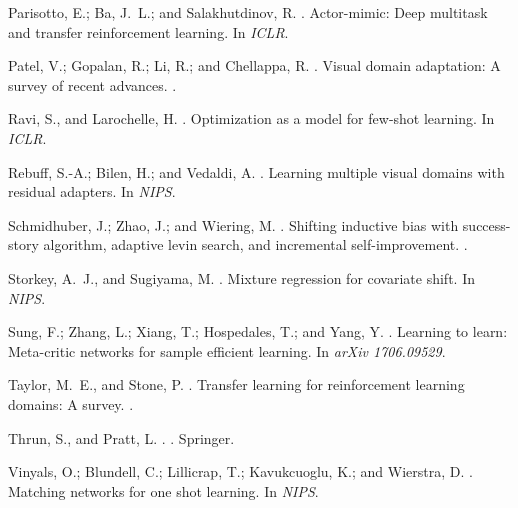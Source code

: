 \documentclass[letterpaper]{article} \usepackage{aaai18}  \usepackage{times}  \usepackage{helvet}  \usepackage{courier}  \usepackage{url}  \usepackage{graphicx}  \usepackage{amsmath}
\begin{document}
{{\begin{thebibliography}{}
Parisotto, E.; Ba, J.~L.; and Salakhutdinov, R.
.
\newblock Actor-mimic: Deep multitask and transfer reinforcement learning.
\newblock In {\em ICLR}.

Patel, V.; Gopalan, R.; Li, R.; and Chellappa, R.
.
\newblock Visual domain adaptation: A survey of recent advances.
.

Ravi, S., and Larochelle, H.
.
\newblock Optimization as a model for few-shot learning.
\newblock In {\em ICLR}.

Rebuff, S.-A.; Bilen, H.; and Vedaldi, A.
.
\newblock Learning multiple visual domains with residual adapters.
\newblock In {\em NIPS}.

Schmidhuber, J.; Zhao, J.; and Wiering, M.
.
\newblock Shifting inductive bias with success-story algorithm, adaptive levin
  search, and incremental self-improvement.
.

Storkey, A.~J., and Sugiyama, M.
.
\newblock Mixture regression for covariate shift.
\newblock In {\em NIPS}.

Sung, F.; Zhang, L.; Xiang, T.; Hospedales, T.; and Yang, Y.
.
\newblock Learning to learn: Meta-critic networks for sample efficient
  learning.
\newblock In {\em arXiv 1706.09529}.

Taylor, M.~E., and Stone, P.
.
\newblock Transfer learning for reinforcement learning domains: A survey.
.

Thrun, S., and Pratt, L.
.
.
\newblock Springer.

Vinyals, O.; Blundell, C.; Lillicrap, T.; Kavukcuoglu, K.; and Wierstra, D.
.
\newblock Matching networks for one shot learning.
\newblock In {\em NIPS}.


\end{thebibliography}}}
\end{document}
